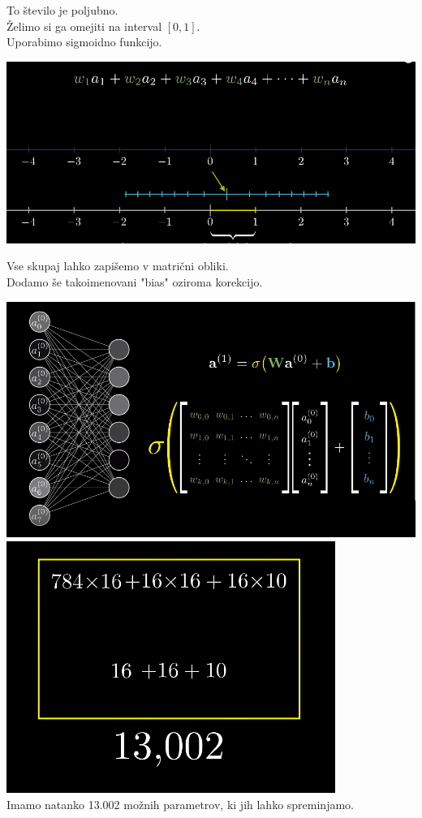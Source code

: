 \documentclass{beamer}
\begin{document}
\begin{frame}{}
To število je poljubno. \\
\smallskip
Želimo si ga omejiti na interval $[0,1]$.\\
\smallskip
Uporabimo sigmoidno funkcijo.
\begin{center}
\includegraphics[scale = 0.55]{photo/foto7}
\end{center}
\end{frame}

\begin{frame}{}
Vse skupaj lahko zapišemo v matrični obliki. \\
\smallskip
Dodamo še takoimenovani "bias" oziroma korekcijo. \\
\bigskip

\includegraphics[scale = 0.27]{photo/foto8}
\includegraphics[scale = 0.3]{photo/foto9} \\

\bigskip
Imamo natanko 13.002 možnih parametrov, ki jih lahko spreminjamo.
\end{frame}
\end{document}
